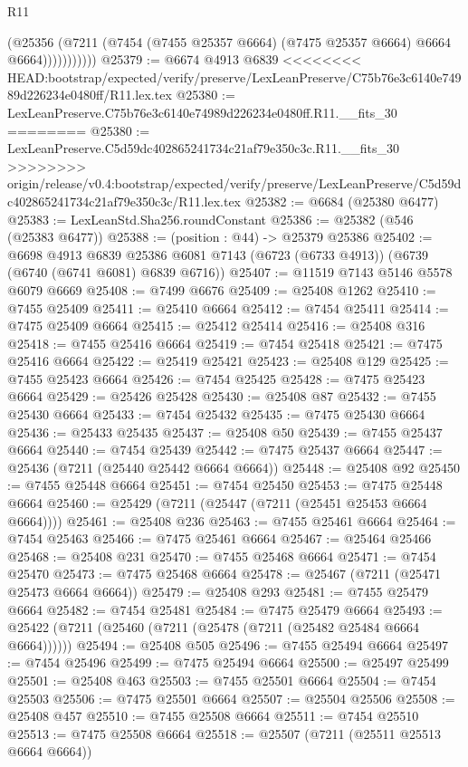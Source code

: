 \begin{lexlean}{R11}
\begin{coremodule}
{{{{{{{{{{{{{{{{{{{{{{{{{{{{{{{{{{{{{{{{{{{{{{{{{{{{{{{{{{{{{{{{{{{{{{{{{{{{{{{{{{                    (@25356
                      (@7211 (@7454 (@7455 @25357 @6664) (@7475 @25357 @6664) @6664 @6664)))))))))))
@25379 := @6674 @4913 @6839
<<<<<<<< HEAD:bootstrap/expected/verify/preserve/LexLeanPreserve/C75b76e3c6140e74989d226234e0480ff/R11.lex.tex
@25380 := LexLeanPreserve.C75b76e3c6140e74989d226234e0480ff.R11.__fits_30
========
@25380 := LexLeanPreserve.C5d59dc402865241734c21af79e350c3c.R11.__fits_30
>>>>>>>> origin/release/v0.4:bootstrap/expected/verify/preserve/LexLeanPreserve/C5d59dc402865241734c21af79e350c3c/R11.lex.tex
@25382 := @6684 (@25380 @6477)
@25383 := LexLeanStd.Sha256.roundConstant
@25386 := @25382 (@546 (@25383 @6477))
@25388 := (position : @44) -> @25379 @25386
@25402 := @6698
    @4913
    @6839
    @25386
    @6081
    @7143
    (@6723 (@6733 @4913))
    (@6739 (@6740 (@6741 @6081) @6839 @6716))
@25407 := @11519 @7143 @5146 @5578 @6079 @6669
@25408 := @7499 @6676
@25409 := @25408 @1262
@25410 := @7455 @25409
@25411 := @25410 @6664
@25412 := @7454 @25411
@25414 := @7475 @25409 @6664
@25415 := @25412 @25414
@25416 := @25408 @316
@25418 := @7455 @25416 @6664
@25419 := @7454 @25418
@25421 := @7475 @25416 @6664
@25422 := @25419 @25421
@25423 := @25408 @129
@25425 := @7455 @25423 @6664
@25426 := @7454 @25425
@25428 := @7475 @25423 @6664
@25429 := @25426 @25428
@25430 := @25408 @87
@25432 := @7455 @25430 @6664
@25433 := @7454 @25432
@25435 := @7475 @25430 @6664
@25436 := @25433 @25435
@25437 := @25408 @50
@25439 := @7455 @25437 @6664
@25440 := @7454 @25439
@25442 := @7475 @25437 @6664
@25447 := @25436 (@7211 (@25440 @25442 @6664 @6664))
@25448 := @25408 @92
@25450 := @7455 @25448 @6664
@25451 := @7454 @25450
@25453 := @7475 @25448 @6664
@25460 := @25429 (@7211 (@25447 (@7211 (@25451 @25453 @6664 @6664))))
@25461 := @25408 @236
@25463 := @7455 @25461 @6664
@25464 := @7454 @25463
@25466 := @7475 @25461 @6664
@25467 := @25464 @25466
@25468 := @25408 @231
@25470 := @7455 @25468 @6664
@25471 := @7454 @25470
@25473 := @7475 @25468 @6664
@25478 := @25467 (@7211 (@25471 @25473 @6664 @6664))
@25479 := @25408 @293
@25481 := @7455 @25479 @6664
@25482 := @7454 @25481
@25484 := @7475 @25479 @6664
@25493 := @25422 (@7211 (@25460 (@7211 (@25478 (@7211 (@25482 @25484 @6664 @6664))))))
@25494 := @25408 @505
@25496 := @7455 @25494 @6664
@25497 := @7454 @25496
@25499 := @7475 @25494 @6664
@25500 := @25497 @25499
@25501 := @25408 @463
@25503 := @7455 @25501 @6664
@25504 := @7454 @25503
@25506 := @7475 @25501 @6664
@25507 := @25504 @25506
@25508 := @25408 @457
@25510 := @7455 @25508 @6664
@25511 := @7454 @25510
@25513 := @7475 @25508 @6664
@25518 := @25507 (@7211 (@25511 @25513 @6664 @6664))
}}}}}}}}}}}}}}}}}}}}}}}}}}}}}}}}}}}}}}}}}}}}}}}}}}}}}}}}}}}}}}}}}}}}}}}}}}}}}}}}}}
\end{coremodule}
\end{lexlean}

